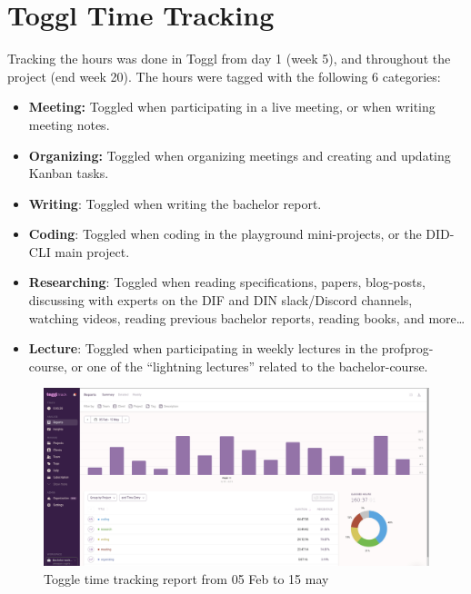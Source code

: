 \pagebreak



\hypertarget{toggl-time-tracking}{%
\section{Toggl Time Tracking}\label{toggl-time-tracking}}

Tracking the hours was done in Toggl from day 1 (week 5), and throughout
the project (end week 20). The hours were tagged with the following 6
categories:

\begin{itemize}
\tightlist
\item
  \textbf{Meeting:} Toggled when participating in a live meeting, or
  when writing meeting notes.
\item
  \textbf{Organizing:} Toggled when organizing meetings and creating and
  updating Kanban tasks.
\item
  \textbf{Writing}: Toggled when writing the bachelor report.
\item
  \textbf{Coding}: Toggled when coding in the playground mini-projects,
  or the DID-CLI main project.
\item
  \textbf{Researching}: Toggled when reading specifications, papers,
  blog-posts, discussing with experts on the DIF and DIN slack/Discord
  channels, watching videos, reading previous bachelor reports, reading
  books, and more\ldots{}
\item
  \textbf{Lecture}: Toggled when participating in weekly lectures in the
  profprog-course, or one of the ``lightning lectures'' related to the
  bachelor-course.
\end{itemize}


\begin{figure}
\centering
\includegraphics[width=\textwidth]{Development Process a132dd5987b94adf8fc5989add9afc3f/Untitled 6.png}
\caption{Toggle time tracking report from 05 Feb to 15 may}
\end{figure}
